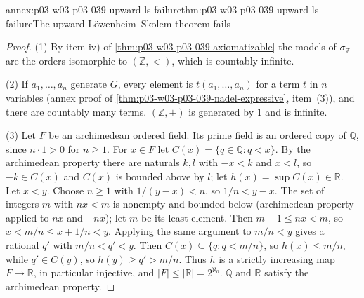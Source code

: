 \begin{annexitem}{annex:p03-w03-p03-039-upward-ls-failure}{thm:p03-w03-p03-039-upward-ls-failure}{The upward L\"owenheim--Skolem theorem fails}
\begin{proof}
(1) By item iv) of \cref{thm:p03-w03-p03-039-axiomatizable} the models of
\(\sigma_{\mathbb Z}\) are the orders isomorphic to \((\mathbb Z,<)\), which
is countably infinite.

(2) If \(a_1,\dots,a_n\) generate \(G\), every element is \(t(a_1,\dots,a_n)\)
for a term \(t\) in \(n\) variables (annex proof of
\cref{thm:p03-w03-p03-039-nadel-expressive}, item~(3)), and there are
countably many terms. \((\mathbb Z,+)\) is generated by \(1\) and is infinite.

(3) Let \(F\) be an archimedean ordered field. Its prime field is an ordered
copy of \(\mathbb Q\), since \(n\cdot1>0\) for \(n\ge1\). For \(x\in F\) let
\(C(x)=\{q\in\mathbb Q:q<x\}\). By the archimedean property there are
naturals \(k,l\) with \(-x<k\) and \(x<l\), so \(-k\in C(x)\) and \(C(x)\) is
bounded above by \(l\); let \(h(x)=\sup C(x)\in\mathbb R\). Let \(x<y\). Choose
\(n\ge1\) with \(1/(y-x)<n\), so \(1/n<y-x\). The set of integers \(m\) with
\(nx<m\) is nonempty and bounded below (archimedean property applied to
\(nx\) and \(-nx\)); let \(m\) be its least element. Then \(m-1\le nx<m\), so
\(x<m/n\le x+1/n<y\). Applying the same argument to \(m/n<y\) gives a
rational \(q'\) with \(m/n<q'<y\). Then \(C(x)\subseteq\{q:q<m/n\}\), so
\(h(x)\le m/n\), while \(q'\in C(y)\), so \(h(y)\ge q'>m/n\). Thus \(h\) is a
strictly increasing map \(F\to\mathbb R\), in particular injective, and
\(\lvert F\rvert\le\lvert\mathbb R\rvert=2^{\aleph_0}\). \(\mathbb Q\) and
\(\mathbb R\) satisfy the archimedean property.
\end{proof}
\end{annexitem}

